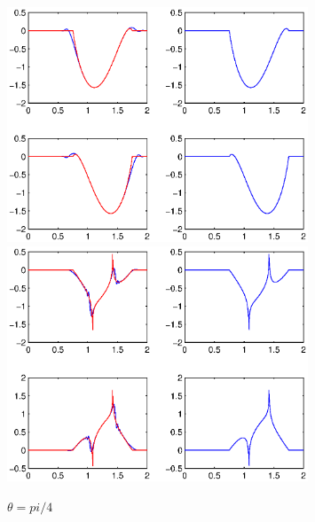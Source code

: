 \documentclass[12pt]{iopart}
\begin{document}
\begin{figure}
	\centering
	\includegraphics[width=0.8\textwidth]{./graphic/pwave_kirchhoff.eps}
	\includegraphics[width=0.8\textwidth]{./graphic/swave_kirchhoff.eps}	
	\caption{$\theta=pi/4$}\label{figure_2}
\end{figure}
\end{document}
